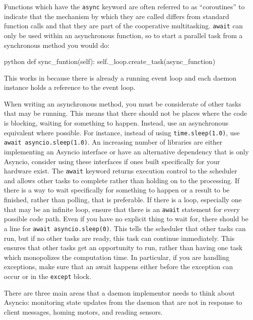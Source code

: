 Functions which have the \texttt{async} keyword are often referred to as ``coroutines'' to indicate that the mechanism by which they are called differs from standard function calls and that they are part of the cooperative multitasking.
\texttt{await} can only be used within an asynchronous function, so to start a parallel task from a synchronous method you would do:

\begin{codefragment}{python}
    def sync_funtion(self):
        self._loop.create_task(async_function)
\end{codefragment}

This works in \yaq{} because there is already a running event loop and each daemon instance holds a reference to the event loop.

When writing an asynchronous method, you must be considerate of other tasks that may be running.
This means that there should not be places where the code is blocking, waiting for something to happen.
Instead, use an asynchronous equivalent where possible.
For instance, instead of using \texttt{time.sleep(1.0)}, use \texttt{await asyncio.sleep(1.0)}.
An increasing number of libraries are either implementing an Asyncio interface or have an alternative dependency that is only Asyncio, consider using these interfaces if ones built specifically for your hardware exist.
The \texttt{await} keyword returns execution control to the scheduler and allows other tasks to complete rather than holding on to the processing.
If there is a way to wait specifically for something to happen or a result to be finished, rather than polling, that is preferable.
If there is a loop, especially one that may be an infinite loop, ensure that there is an \texttt{await} statement for every possible code path.
Even if you have no explicit thing to wait for, there should be a line for \texttt{await asyncio.sleep(0)}.
This tells the scheduler that other tasks can run, but if no other tasks are ready, this task can continue immediately.
This ensures that other tasks get an opportunity to run, rather than having one task which monopolizes the computation time.
In particular, if you are handling exceptions, make sure that an await happens either before the exception can occur or in the \texttt{except} block.

There are three main areas that a daemon implementor needs to think about Asyncio: monitoring state updates from the daemon that are not in response to client messages, homing motors, and reading sensors.

